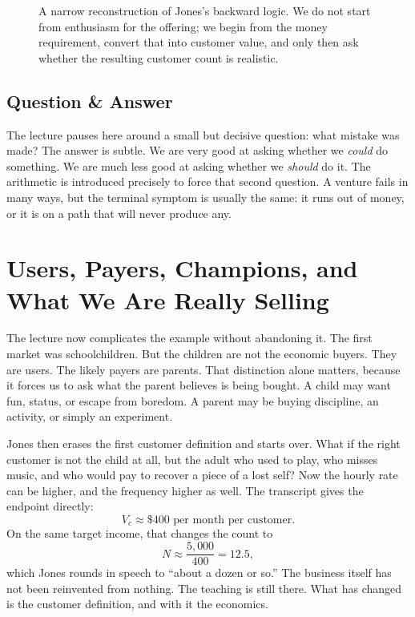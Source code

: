 \begin{figure}
\centering
{}
\caption{A narrow reconstruction of Jones's backward logic. We do not start from enthusiasm for the offering; we begin from the money requirement, convert that into customer value, and only then ask whether the resulting customer count is realistic.}
\end{figure}

\subsection{Question \& Answer}

The lecture pauses here around a small but decisive question: what mistake was made? The answer is subtle. We are very good at asking whether we \emph{could} do something. We are much less good at asking whether we \emph{should} do it. The arithmetic is introduced precisely to force that second question. A venture fails in many ways, but the terminal symptom is usually the same: it runs out of money, or it is on a path that will never produce any.

\section{Users, Payers, Champions, and What We Are Really Selling}

The lecture now complicates the example without abandoning it. The first market was schoolchildren. But the children are not the economic buyers. They are users. The likely payers are parents. That distinction alone matters, because it forces us to ask what the parent believes is being bought. A child may want fun, status, or escape from boredom. A parent may be buying discipline, an activity, or simply an experiment.

Jones then erases the first customer definition and starts over. What if the right customer is not the child at all, but the adult who used to play, who misses music, and who would pay to recover a piece of a lost self? Now the hourly rate can be higher, and the frequency higher as well. The transcript gives the endpoint directly:
\[
V_c\approx \$400 \text{ per month per customer.}
\]
On the same target income, that changes the count to
\begin{equation}
N\approx \frac{5{,}000}{400}=12.5,
\end{equation}
which Jones rounds in speech to ``about a dozen or so.'' The business itself has not been reinvented from nothing. The teaching is still there. What has changed is the customer definition, and with it the economics.

